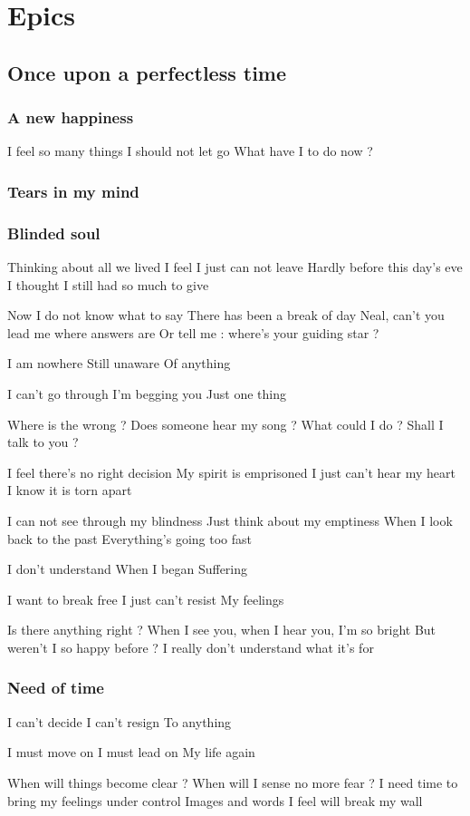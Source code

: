 \documentclass{article}
\newenvironment{album}[1]%
{%
  \section*{#1}
}%
{%
}
\newenvironment{song}[1]%
{%
  \subsection*{\textbf{#1}}
  \begin{multicols*}{2}
}%
{%
  \end{multicols*}
  \newpage
}
\newenvironment{partie}[1]%
{%
  \subsubsection{#1}
}%
{%
}
\newenvironment{couplet} %
{%
  \verbatim
}%
{% end code
  \endverbatim
}
\newenvironment{refrain} %
{%
  \verbatim
}%
{% end code
  \endverbatim
}
\newenvironment{prerefrain} %
{%
  \verbatim
}%
{% end code
  \endverbatim
}
\begin{document}
\begin{album}{Epics}
\begin{song}{Once upon a perfectless time}
\begin{partie}{A new happiness}
\begin{refrain}
I feel so many things I should not let go
What have I to do now ?  
\end{refrain}
\end{partie}
\begin{partie}{Tears in my mind}
\end{partie}
\begin{partie}{Blinded soul}
\begin{couplet}
Thinking about all we lived
I feel I just can not leave
Hardly before this day’s eve
I thought I still had so much to give  
\end{couplet}
\begin{couplet}
Now I do not know what to say
There has been a break of day
Neal, can’t you lead me where answers are
Or tell me : where’s your guiding star ? 
\end{couplet}
\begin{prerefrain}
I am nowhere
Still unaware
Of anything

I can’t go through
I’m begging you
Just one thing
\end{prerefrain}
\begin{refrain}
Where is the wrong ?
Does someone hear my song ?
What could I do ?
Shall I talk to you ?  
\end{refrain}
\begin{couplet}
I feel there’s no right decision
My spirit is emprisoned
I just can’t hear my heart
I know it is torn apart
\end{couplet}
\begin{couplet}
I can not see through my blindness
Just think about my emptiness
When I look back to the past
Everything’s going too fast  
\end{couplet}
\begin{prerefrain}
I don’t understand
When I began
Suffering

I want to break free
I just can’t resist
My feelings  
\end{prerefrain}
\begin{refrain}
Is there anything right ?
When I see you, when I hear you, I’m so bright
But weren’t I so happy before ?
I really don’t understand what it’s for 
\end{refrain}  
\end{partie}
\begin{partie}{Need of time}
\begin{refrain}
I can’t decide
I can’t resign
To anything
\end{refrain}
\begin{refrain}
I must move on
I must lead on
My life again
\end{refrain}
\begin{refrain}
When will things become clear ?
When will I sense no more fear ?
I need time to bring my feelings under control
Images and words I feel will break my wall
\end{refrain}
\end{partie}
\end{song}


\end{album}
\end{document}
